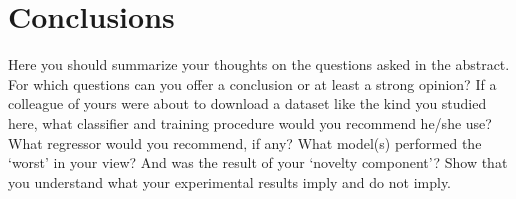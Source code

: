 \section{Conclusions}

Here you should summarize your thoughts on the questions asked in the abstract.
For which questions can you offer a conclusion or at least a strong opinion?
If a colleague of yours were about to download a dataset like the kind you studied here,
what classifier and training procedure would you recommend he/she use?
What regressor would you recommend, if any?
What model(s) performed the `worst' in your view?
And was the result of your `novelty component'?
Show that you understand what your experimental results imply and do not imply.